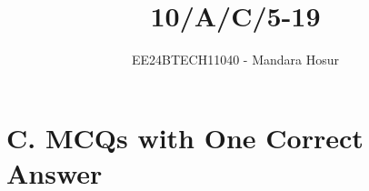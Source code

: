 \documentclass[journal]{IEEEtran}
\begin{document}

\vspace{3cm}

\title{10/A/C/5-19}
\author{EE24BTECH11040 - Mandara Hosur}
{\let\newpage\relax\maketitle}

\renewcommand{\thefigure}{\theenumi}
\renewcommand{\thetable}{\theenumi}
\setlength{\intextsep}{10pt} %


\renewcommand{\thetable}{\theenumi}

\section*{\textbf{C. MCQs with One Correct Answer}}
\end{document}
